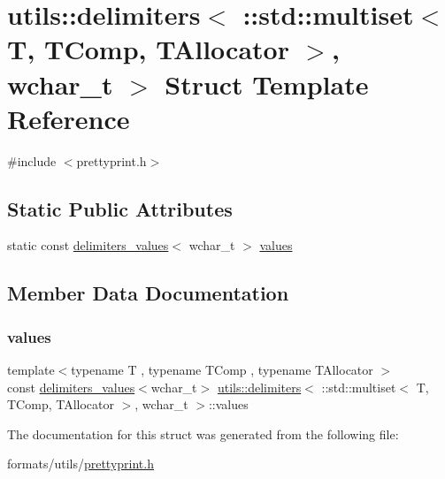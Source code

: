 \hypertarget{structutils_1_1delimiters_3_01_1_1std_1_1multiset_3_01_t_00_01_t_comp_00_01_t_allocator_01_4_00_01wchar__t_01_4}{}\section{utils\+::delimiters$<$ \+::std\+::multiset$<$ T, T\+Comp, T\+Allocator $>$, wchar\+\_\+t $>$ Struct Template Reference}
\label{structutils_1_1delimiters_3_01_1_1std_1_1multiset_3_01_t_00_01_t_comp_00_01_t_allocator_01_4_00_01wchar__t_01_4}


{\ttfamily \#include $<$prettyprint.\+h$>$}

\subsection*{Static Public Attributes}
\begin{DoxyCompactItemize}
\item 
static const \mbox{\hyperlink{structutils_1_1delimiters__values}{delimiters\+\_\+values}}$<$ wchar\+\_\+t $>$ \mbox{\hyperlink{structutils_1_1delimiters_3_01_1_1std_1_1multiset_3_01_t_00_01_t_comp_00_01_t_allocator_01_4_00_01wchar__t_01_4_af4ee2775a4066b5672048361235d8e94}{values}}
\end{DoxyCompactItemize}


\subsection{Member Data Documentation}
\mbox{\label{structutils_1_1delimiters_3_01_1_1std_1_1multiset_3_01_t_00_01_t_comp_00_01_t_allocator_01_4_00_01wchar__t_01_4_af4ee2775a4066b5672048361235d8e94}} 
\subsubsection{\texorpdfstring{values}{values}}
{\footnotesize\ttfamily template$<$typename T , typename T\+Comp , typename T\+Allocator $>$ \\
const \mbox{\hyperlink{structutils_1_1delimiters__values}{delimiters\+\_\+values}}$<$wchar\+\_\+t$>$ \mbox{\hyperlink{structutils_1_1delimiters}{utils\+::delimiters}}$<$ \+::std\+::multiset$<$ T, T\+Comp, T\+Allocator $>$, wchar\+\_\+t $>$\+::values\hspace{0.3cm}{\ttfamily [static]}}



The documentation for this struct was generated from the following file\+:\begin{DoxyCompactItemize}
\item 
formats/utils/\mbox{\hyperlink{prettyprint_8h}{prettyprint.\+h}}\end{DoxyCompactItemize}
